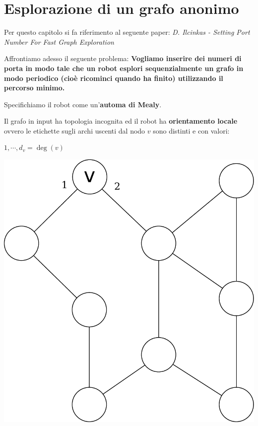 \chapter{Esplorazione di un grafo anonimo}

Per questo capitolo si fa riferimento al seguente paper: \emph{D. Ilcinkas -
    Setting Port Number For Fast Graph Exploration}

Affrontiamo adesso il seguente problema: \textbf{Vogliamo inserire dei numeri di
    porta in modo tale che un robot esplori sequenzialmente un grafo in modo
    periodico (cioè ricominci quando ha finito) utilizzando il percorso minimo.}


Specifichiamo il robot come un'\textbf{automa di Mealy}.

Il grafo in input ha topologia incognita ed il robot ha \textbf{orientamento
    locale} ovvero le etichette sugli archi uscenti dal nodo $v$ sono distinti e con
valori:
\begin{center}
    $1, \cdots, d_v = \deg (v)$\end{center}
\begin{center}
    \includegraphics[scale=0.3]{capitoli/esplorazione-grafo-anonimo/imgs/n_25}
\end{center}

